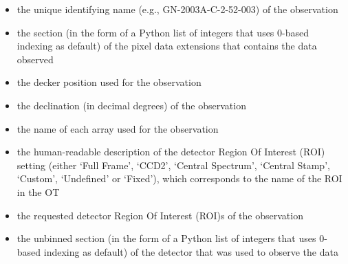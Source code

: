 \documentclass[letterpaper,10pt,english]{sphinxmanual}
\begin{document}
\begin{itemize}
\item {} 
the unique identifying name (e.g., GN-2003A-C-2-52-003) of the observation

\end{itemize}

\begin{itemize}
\item {} 
the section (in the form of a Python list of integers that uses 0-based
indexing as default) of the pixel data extensions that contains the data
observed

\end{itemize}

\begin{itemize}
\item {} 
the decker position used for the observation

\end{itemize}

\begin{itemize}
\item {} 
the declination (in decimal degrees) of the observation

\end{itemize}

\begin{itemize}
\item {} 
the name of each array used for the observation

\end{itemize}

\begin{itemize}
\item {} 
the human-readable description of the detector Region Of Interest (ROI)
setting (either `Full Frame', `CCD2', `Central Spectrum', `Central Stamp',
`Custom', `Undefined' or `Fixed'), which corresponds to the name of the ROI
in the OT

\end{itemize}

\begin{itemize}
\item {} 
the requested detector Region Of Interest (ROI)s of the observation

\end{itemize}

\begin{itemize}
\item {} 
the unbinned section (in the form of a Python list of integers that uses
0-based indexing as default) of the detector that was used to observe the
data

\end{itemize}
\end{document}
